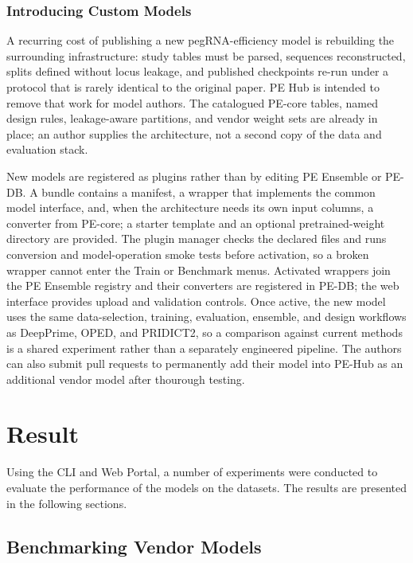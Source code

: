 \documentclass{article}
\begin{document}
\subsubsection{Introducing Custom Models}

A recurring cost of publishing a new pegRNA-efficiency model is rebuilding the surrounding infrastructure: study tables must be parsed, sequences reconstructed, splits defined without locus leakage, and published checkpoints re-run under a protocol that is rarely identical to the original paper. PE Hub is intended to remove that work for model authors. The catalogued PE-core tables, named design rules, leakage-aware partitions, and vendor weight sets are already in place; an author supplies the architecture, not a second copy of the data and evaluation stack.

New models are registered as plugins rather than by editing PE Ensemble or PE-DB. A bundle contains a manifest, a wrapper that implements the common model interface, and, when the architecture needs its own input columns, a converter from PE-core; a starter template and an optional pretrained-weight directory are provided. The plugin manager checks the declared files and runs conversion and model-operation smoke tests before activation, so a broken wrapper cannot enter the Train or Benchmark menus. Activated wrappers join the PE Ensemble registry and their converters are registered in PE-DB; the web interface provides upload and validation controls. Once active, the new model uses the same data-selection, training, evaluation, ensemble, and design workflows as DeepPrime, OPED, and PRIDICT2, so a comparison against current methods is a shared experiment rather than a separately engineered pipeline. The authors can also submit pull requests to permanently add their model into PE-Hub as an additional vendor model after thourough testing.


\section{Result}

Using the CLI and Web Portal, a number of experiments were conducted to evaluate the performance of the models on the datasets. The results are presented in the following sections.

\subsection{Benchmarking Vendor Models}
\end{document}
